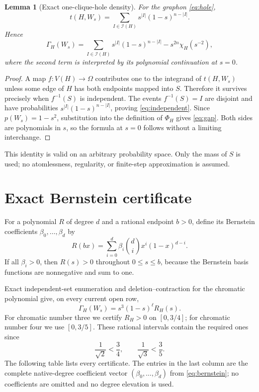 \documentclass[11pt]{article}
\newtheorem{lemma}[theorem]{Lemma}
\newcommand{\Gap}{\Gamma_H}
\begin{document}
\begin{lemma}[Exact one-clique-hole density]\label{lem:independent}
For the graphon \eqref{eq:hole},
\begin{equation}
 t(H,W_s)=
 \sum_{I\in\mathcal I(H)}s^{|I|}(1-s)^{n-|I|}.
 \label{eq:independent}
\end{equation}
Hence
\begin{equation}
 \Gap(W_s)=
 \sum_{I\in\mathcal I(H)}s^{|I|}(1-s)^{n-|I|}
 -s^{2n}\chi_H(s^{-2}),
 \label{eq:gap}
\end{equation}
where the second term is interpreted by its polynomial continuation at
$s=0$.
\end{lemma}

\begin{proof}
A map $f:V(H)\to\Omega$ contributes one to the integrand of $t(H,W_s)$
unless some edge of $H$ has both endpoints mapped into $S$.  Therefore it
survives precisely when $f^{-1}(S)$ is independent.  The events
$f^{-1}(S)=I$ are disjoint and have probabilities
$s^{|I|}(1-s)^{n-|I|}$, proving \eqref{eq:independent}.  Since
$p(W_s)=1-s^2$, substitution into the definition of $\Phi_H$ gives
\eqref{eq:gap}.  Both sides are polynomials in $s$, so the formula at $s=0$
follows without a limiting interchange.
\end{proof}

This identity is valid on an arbitrary probability space.  Only the mass of
$S$ is used; no atomlessness, regularity, or finite-step approximation is
assumed.

\section{Exact Bernstein certificate}

For a polynomial $R$ of degree $d$ and a rational endpoint $b>0$, define its
Bernstein coefficients $\beta_0,\ldots,\beta_d$ by
\begin{equation}
 R(bx)=\sum_{i=0}^d\beta_i\binom di x^i(1-x)^{d-i}.
 \label{eq:bernstein}
\end{equation}
If all $\beta_i>0$, then $R(s)>0$ throughout $0\leq s\leq b$, because the
Bernstein basis functions are nonnegative and sum to one.

Exact independent-set enumeration and deletion--contraction for the
chromatic polynomial give, on every current open row,
\begin{equation}
 \Gap(W_s)=s^3(1-s)^\ell R_H(s).
 \label{eq:factor}
\end{equation}
For chromatic number three we certify $R_H>0$ on $[0,3/4]$; for chromatic
number four we use $[0,3/5]$.  These rational intervals contain the required
ones since
\[
 \frac1{\sqrt2}<\frac34,
 \qquad
 \frac1{\sqrt3}<\frac35.
\]
The following table lists every certificate.  The entries in the last
column are the complete native-degree coefficient vector
$(\beta_0,\ldots,\beta_d)$ from \eqref{eq:bernstein}; no coefficients are
omitted and no degree elevation is used.
\end{document}
